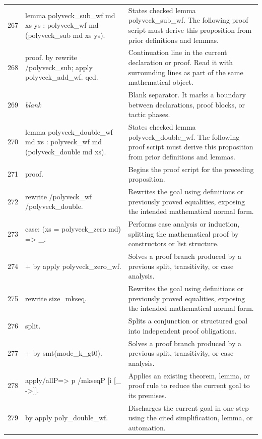 \documentclass[10pt]{article}
\begin{document}
\begin{longtable}{r L{0.53\textwidth} L{0.37\textwidth}}
267 & {\ttfamily\scriptsize lemma polyveck\_sub\_wf md xs ys : polyveck\_wf md (polyveck\_sub md xs ys).} & States checked lemma polyveck\_sub\_wf.  The following proof script must derive this proposition from prior definitions and lemmas. \\
268 & {\ttfamily\scriptsize proof. by rewrite /polyveck\_sub; apply polyveck\_add\_wf. qed.} & Continuation line in the current declaration or proof.  Read it with surrounding lines as part of the same mathematical object. \\
269 & {\ttfamily\scriptsize \emph{blank}} & Blank separator.  It marks a boundary between declarations, proof blocks, or tactic phases. \\
270 & {\ttfamily\scriptsize lemma polyveck\_double\_wf md xs : polyveck\_wf md (polyveck\_double md xs).} & States checked lemma polyveck\_double\_wf.  The following proof script must derive this proposition from prior definitions and lemmas. \\
271 & {\ttfamily\scriptsize proof.} & Begins the proof script for the preceding proposition. \\
272 & {\ttfamily\scriptsize rewrite /polyveck\_wf /polyveck\_double.} & Rewrites the goal using definitions or previously proved equalities, exposing the intended mathematical normal form. \\
273 & {\ttfamily\scriptsize case: (xs = polyveck\_zero md) => \_.} & Performs case analysis or induction, splitting the mathematical proof by constructors or list structure. \\
274 & {\ttfamily\scriptsize + by apply polyveck\_zero\_wf.} & Solves a proof branch produced by a previous split, transitivity, or case analysis. \\
275 & {\ttfamily\scriptsize rewrite size\_mkseq.} & Rewrites the goal using definitions or previously proved equalities, exposing the intended mathematical normal form. \\
276 & {\ttfamily\scriptsize split.} & Splits a conjunction or structured goal into independent proof obligations. \\
277 & {\ttfamily\scriptsize + by smt(mode\_k\_gt0).} & Solves a proof branch produced by a previous split, transitivity, or case analysis. \\
278 & {\ttfamily\scriptsize apply/allP=> p /mkseqP [i [\_ ->]].} & Applies an existing theorem, lemma, or proof rule to reduce the current goal to its premises. \\
279 & {\ttfamily\scriptsize by apply poly\_double\_wf.} & Discharges the current goal in one step using the cited simplification, lemma, or automation. \\

\end{longtable}
\end{document}
